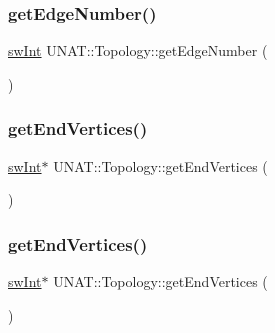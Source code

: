 \mbox{\label{classUNAT_1_1Topology_ace06d8f272b20bdf46d3327f9e0fddf2}} 
\subsubsection{\texorpdfstring{getEdgeNumber()}{getEdgeNumber()}\hspace{0.1cm}{\footnotesize\ttfamily [3/3]}}
{\footnotesize\ttfamily \mbox{\hyperlink{include_2swMacro_8h_a113cf5f6b5377cdf3fac6aa4e443e9aa}{sw\+Int}} U\+N\+A\+T\+::\+Topology\+::get\+Edge\+Number (\begin{DoxyParamCaption}{ }\end{DoxyParamCaption})}

\mbox{\label{classUNAT_1_1Topology_a656c287d7a5971a6176c6f379825f3db}} 
\subsubsection{\texorpdfstring{getEndVertices()}{getEndVertices()}\hspace{0.1cm}{\footnotesize\ttfamily [1/3]}}
{\footnotesize\ttfamily \mbox{\hyperlink{include_2swMacro_8h_a113cf5f6b5377cdf3fac6aa4e443e9aa}{sw\+Int}}$\ast$ U\+N\+A\+T\+::\+Topology\+::get\+End\+Vertices (\begin{DoxyParamCaption}{ }\end{DoxyParamCaption})}

\mbox{\label{classUNAT_1_1Topology_a656c287d7a5971a6176c6f379825f3db}} 
\subsubsection{\texorpdfstring{getEndVertices()}{getEndVertices()}\hspace{0.1cm}{\footnotesize\ttfamily [2/3]}}
{\footnotesize\ttfamily \mbox{\hyperlink{include_2swMacro_8h_a113cf5f6b5377cdf3fac6aa4e443e9aa}{sw\+Int}}$\ast$ U\+N\+A\+T\+::\+Topology\+::get\+End\+Vertices (\begin{DoxyParamCaption}{ }\end{DoxyParamCaption})}

